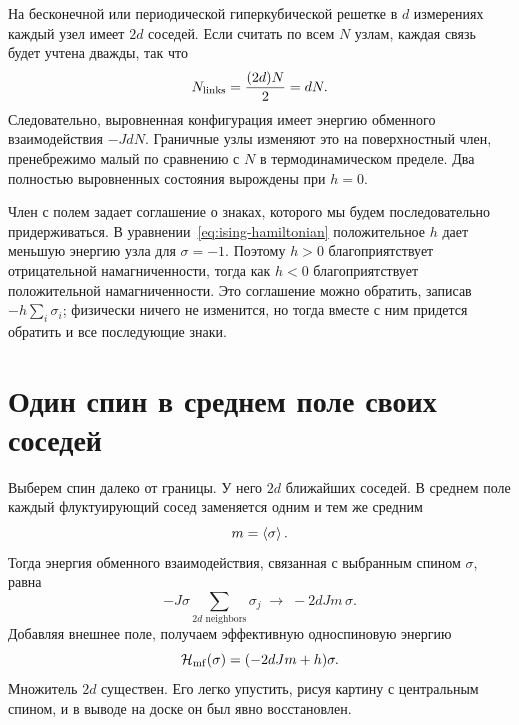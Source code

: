 На бесконечной или периодической гиперкубической решетке в \(d\) измерениях каждый узел имеет \(2d\) соседей. Если считать по всем \(N\) узлам, каждая связь будет учтена дважды, так что
\begin{equation}
N_{\rm links}=\frac{(2d)N}{2}=dN.
\label{eq:number-links}
\end{equation}
Следовательно, выровненная конфигурация имеет энергию обменного взаимодействия \(-JdN\). Граничные узлы изменяют это на поверхностный член, пренебрежимо малый по сравнению с \(N\) в термодинамическом пределе. Два полностью выровненных состояния вырождены при \(h=0\).

Член с полем задает соглашение о знаках, которого мы будем последовательно придерживаться. В уравнении~\eqref{eq:ising-hamiltonian} положительное \(h\) дает меньшую энергию узла для \(\sigma=-1\). Поэтому \(h>0\) благоприятствует отрицательной намагниченности, тогда как \(h<0\) благоприятствует положительной намагниченности. Это соглашение можно обратить, записав \(-h\sum_i\sigma_i\); физически ничего не изменится, но тогда вместе с ним придется обратить и все последующие знаки.

\begin{classroomqa}
\end{classroomqa}

\section{Один спин в среднем поле своих соседей}

Выберем спин далеко от границы. У него \(2d\) ближайших соседей. В среднем поле каждый флуктуирующий сосед заменяется одним и тем же средним
\begin{equation}
m=\left\langle\sigma\right\rangle.
\end{equation}
Тогда энергия обменного взаимодействия, связанная с выбранным спином \(\sigma\), равна
\begin{equation}
-J\sigma\sum_{\text{\(2d\) neighbors}}\sigma_j
\;\longrightarrow\;-2dJm\,\sigma.
\end{equation}
Добавляя внешнее поле, получаем эффективную односпиновую энергию
\begin{equation}
\mathcal H_{\rm mf}(\sigma)=(-2dJm+h)\sigma.
\label{eq:mean-field-one-spin}
\end{equation}
Множитель \(2d\) существен. Его легко упустить, рисуя картину с центральным спином, и в выводе на доске он был явно восстановлен.

